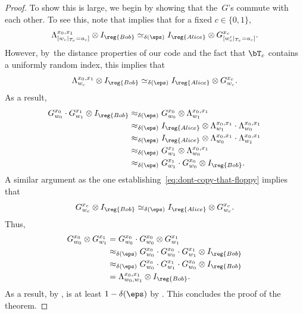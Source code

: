 \begin{proof}
To show this is large, we begin by showing that the~$G$'s commute with each other.
To see this, note that  implies that for a fixed $c \in \{0, 1\}$,
\begin{equation*}
\Lambda^{x_0, x_1}_{[w_c|_{T_c} = a_c]} \otimes I_{\reg{Bob}}\simeq_{\delta(\eps)}
 I_{\reg{Alice}} \otimes G^{x_c}_{[w_c'|_{T_c} = a_c]}.
\end{equation*}
However, by~the distance properties of our code and the fact that $\bT_c$ contains a uniformly random index, this implies that
\begin{equation}\label{eq:dont-copy-that-floppy}
\Lambda^{x_0, x_1}_{w_c} \otimes I_{\reg{Bob}}\simeq_{\delta(\eps)}
 I_{\reg{Alice}} \otimes G^{x_c}_{w_c}.
\end{equation}
As a result,
\begin{align*}
G^{x_0}_{w_0} \cdot G^{x_1}_{w_1} \otimes I_{\reg{Bob}}
&\approx_{\delta(\eps)} G^{x_0}_{w_0} \otimes \Lambda^{x_0, x_1}_{w_1}\\
&\approx_{\delta(\eps)} I_{\reg{Alice}} \otimes \Lambda^{x_0, x_1}_{w_1}\cdot \Lambda^{x_0, x_1}_{w_0}\\
&\approx_{\delta(\eps)} I_{\reg{Alice}} \otimes \Lambda^{x_0, x_1}_{w_0}\cdot \Lambda^{x_0, x_1}_{w_1}\\
&\approx_{\delta(\eps)} G^{x_1}_{w_1} \otimes \Lambda^{x_0, x_1}_{w_0}\\
&\approx_{\delta(\eps)}  G^{x_1}_{w_1} \cdot G^{x_0}_{w_0} \otimes I_{\reg{Bob}}.
\end{align*}
A similar argument as the one establishing~\eqref{eq:dont-copy-that-floppy} implies that
\begin{equation*}
G^{x_c}_{w_c} \otimes I_{\reg{Bob}}\simeq_{\delta(\eps)}
 I_{\reg{Alice}} \otimes G^{x_c}_{w_c}.
\end{equation*}
Thus,
\begin{align*}
G^{x_0}_{w_0} \otimes G^{x_1}_{w_1}
&= G^{x_0}_{w_0} \cdot G^{x_0}_{w_0} \otimes G^{x_1}_{w_1}\\
&\approx_{\delta(\eps)} G^{x_0}_{w_0} \cdot G^{x_0}_{w_0} \cdot G^{x_1}_{w_1} \otimes I_{\reg{Bob}}\\
&\approx_{\delta(\eps)} G^{x_0}_{w_0} \cdot G^{x_1}_{w_1} \cdot G^{x_0}_{w_0} \otimes I_{\reg{Bob}}\\
&= \Lambda^{x_0, x_1}_{w_0, w_1} \otimes I_{\reg{Bob}}.
\end{align*}
As a result, by ,   is at least $1-\delta(\eps)$ by .
This concludes the proof of the theorem.
\end{proof}

